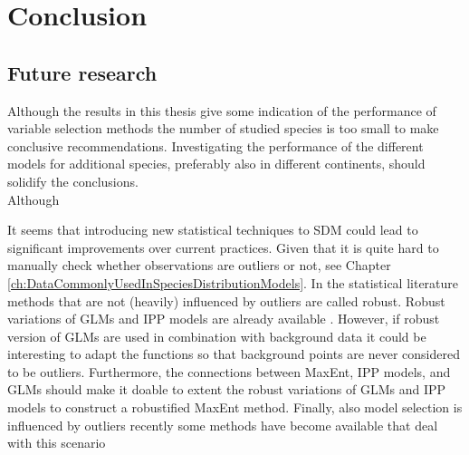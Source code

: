 \chapter{Conclusion}
\label{ch:Conclussion}
\section{}

\section{Future research}
Although the results in this thesis give some indication of the performance of variable selection methods the number of studied species is too small to make conclusive recommendations. Investigating the performance of the different models for additional species, preferably also in different continents, should solidify the conclusions.\\

Although


It seems that introducing new statistical techniques to SDM could lead to significant improvements over current practices. Given that it is quite hard to manually check whether observations are outliers or not, see Chapter \ref{ch:DataCommonlyUsedInSpeciesDistributionModels}. In the statistical literature methods that are not (heavily) influenced by outliers are called robust. Robust variations of GLMs and IPP models are already available \parencite{cantoni_robust_2001, assuncao_robustness_1999}. However, if robust version of GLMs are used in combination with background data it could be interesting to adapt the functions so that background points are never considered to be outliers. Furthermore, the connections between MaxEnt, IPP models, and GLMs should make it doable to extent the robust variations of GLMs and IPP models to construct a robustified MaxEnt method. Finally, also model selection is influenced by outliers recently some methods have become available that deal with this scenario \parencite[e.g.][]{muller_robust_2009} \\

